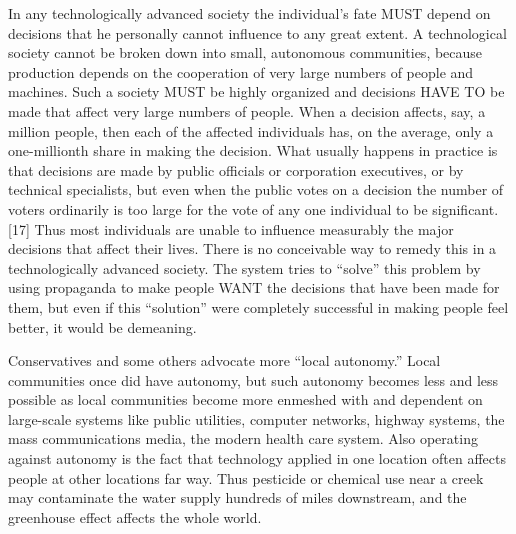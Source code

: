  In any technologically advanced society the individual’s fate MUST depend on decisions that he personally cannot influence to any great extent. A technological society cannot be broken down into small, autonomous communities, because production depends on the cooperation of very large numbers of people and machines. Such a society MUST be highly organized and decisions HAVE TO be made that affect very large numbers of people. When a decision affects, say, a million people, then each of the affected individuals has, on the average, only a one-millionth share in making the decision. What usually happens in practice is that decisions are made by public officials or corporation executives, or by technical specialists, but even when the public votes on a decision the number of voters ordinarily is too large for the vote of any one individual to be significant. [17] Thus most individuals are unable to influence measurably the major decisions that affect their lives. There is no conceivable way to remedy this in a technologically advanced society. The system tries to “solve” this problem by using propaganda to make people WANT the decisions that have been made for them, but even if this “solution” were completely successful in making people feel better, it would be demeaning.

 Conservatives and some others advocate more “local autonomy.” Local communities once did have autonomy, but such autonomy becomes less and less possible as local communities become more enmeshed with and dependent on large-scale systems like public utilities, computer networks, highway systems, the mass communications media, the modern health care system. Also operating against autonomy is the fact that technology applied in one location often affects people at other locations far way. Thus pesticide or chemical use near a creek may contaminate the water supply hundreds of miles downstream, and the greenhouse effect affects the whole world.

